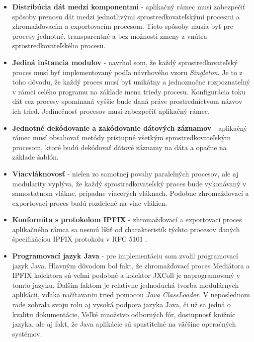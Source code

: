 \begin{itemize}
 \item \textbf{Distribúcia dát medzi komponentmi} - aplikačný rámec musí zabezpečiť spôsoby prenosu dát medzi 
 jednotlivými sprostredkovateľskými procesmi a zhromažďovacím a exportovacím procesom. Tieto spôsoby 
 musia byť pre procesy jednotné, transparentné a bez možnosti zmeny z vnútra sprostredkovateľského procesu.
 
 \item \textbf{Jediná inštancia modulov} - navrhol som, že každý sprostredkovateľský
 proces musí byť implementovaný podľa návrhového vzoru \emph{Singleton}. Je to z toho dôvodu, že 
 každý proces musí byť unikátny a jednoznačne rozpoznateľný v rámci celého programu na 
 základe mena triedy procesu. Konfigurácia toku dát cez procesy spomínaná vyššie bude daná práve 
 prostredníctvom názvov ich tried. Jedinečnosť procesov musí zabezpečiť aplikačný rámec. 
 
 \item \textbf{Jednotné dekódovanie a zakódovanie dátových záznamov} - aplikačný rámec musí obsahovať metódy 
 prístupné všetkým sprostredkovateľským procesom, ktoré budú dekódovať dátové záznamy na dáta a opačne
 na základe šablón.
 
 \item \textbf{Viacvláknovosť} - nielen zo samotnej povahy paralelných procesov, ale aj modularity vyplýva, 
 že každý sprostredkovateľský proces bude vykonávaný v samostatnom vlákne, prípadne viacerých vláknach. 
 Podobne zhromažďovací a exportovací proces budú rozdelené na viac vlákien. 
 

 \item \textbf{Konformita s protokolom IPFIX} - zhromažďovací a exportovací proces aplikačného rámca sa 
 nesmú líšiť od charakteristík týchto procesov daných špecifikáciou IPFIX protokolu v RFC 5101 \citep{rfc5101}.
 
 \item \textbf{Programovací jazyk Java} - pre implementáciu som zvolil programovací jazyk Java.
 Hlavným dôvodom bol fakt, že zhromažďovací proces Mediátora a IPFIX kolektora sú veľmi podobné a kolektor 
 JXColl je naprogramovaný v tomto jazyku. Ďalším faktom je relatívne jednoduchá tvorba modulárnych aplikácii,
 vďaka načítavaniu tried pomocou \emph{Java ClassLoader}. V neposlednom rade zohrala svoju rolu aj vysoká
 podpora jazyka Java, či už sa jedná o kvalitu dokumentácie, Veľké množstvo odborných fór, dostupnosť 
 knižníc jazyka, ale aj fakt, že Java aplikácie sú spustiteľné na väčšine operačných systémov.
\end{itemize}

